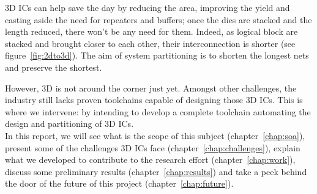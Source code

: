 \documentclass[11pt,a4paper]{report} %
\theoremstyle{customdef}
\begin{document}
3D ICs can help save the day by reducing the area, improving the yield and casting aside the need for repeaters and buffers; once the dies are stacked and the length reduced, there won't be any need for them.
Indeed, as logical block are stacked and brought closer to each other, their interconnection is shorter (see figure~\ref{fig:2dto3d}).
The aim of system partitioning is to shorten the longest nets and preserve the shortest.

However, 3D is not around the corner just yet.
Amongst other challenges, the industry still lacks proven toolchains capable of designing those 3D ICs.
This is where we intervene: by intending to develop a complete toolchain automating the design and partitioning of 3D ICs.\\

In this report, we will see what is the scope of this subject (chapter~\ref{chap:soa}), present some of the challenges 3D ICs face (chapter~\ref{chap:challenges}), explain what we developed to contribute to the research effort (chapter~\ref{chap:work}), discuss some preliminary results (chapter~\ref{chap:results}) and take a peek behind the door of the future of this project (chapter~\ref{chap:future}).






\end{document}
